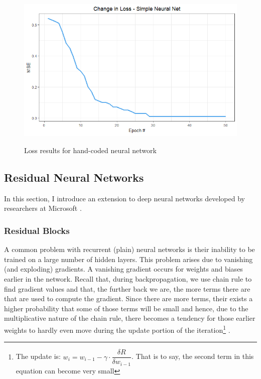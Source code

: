 \documentclass{article}
\begin{document}
\begin{figure}[h!]
  \centering
  \includegraphics[scale = 0.7]{NN_scratch_loss2.png}
  \label{fig:scratchNN}
  \caption{Loss results for hand-coded neural network}
\end{figure}


\subsection{Residual Neural Networks}
\label{sec:resnn}
\noindent In this section, I introduce an extension to deep neural networks developed by researchers at Microsoft \cite{resnet}. 

\subsubsection{Residual Blocks}

\noindent A common problem with recurrent (plain) neural networks is their inability to be trained on a large number of hidden layers. This problem arises due to vanishing (and exploding) gradients. A vanishing gradient occurs for weights and biases earlier in the network. Recall that, during backpropagation, we use chain rule to find gradient values and that, the further back we are, the more terms there are that are used to compute the gradient. Since there are more terms, their exists a higher probability that some of those terms will be small and hence, due to the multiplicative nature of the chain rule, there becomes a tendency for those earlier weights to hardly even move during the update portion of the iteration\footnote{The update is: $w_{i} = w_{i - 1} - \gamma \cdot \dfrac{\delta R}{\delta w_{i - 1}}$. That is to say, the second term in this equation can become very small} \cite{deep}.
\end{document}
